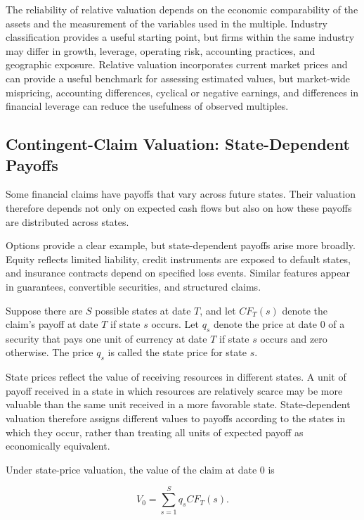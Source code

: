 The reliability of relative valuation depends on the economic comparability of the assets and the measurement of the variables used in the multiple. Industry classification provides a useful starting point, but firms within the same industry may differ in growth, leverage, operating risk, accounting practices, and geographic exposure. Relative valuation incorporates current market prices and can provide a useful benchmark for assessing estimated values, but market-wide mispricing, accounting differences, cyclical or negative earnings, and differences in financial leverage can reduce the usefulness of observed multiples.


\subsection{Contingent-Claim Valuation: State-Dependent Payoffs}

Some financial claims have payoffs that vary across future states. Their valuation therefore depends not only on expected cash flows but also on how these payoffs are distributed across states.

Options provide a clear example, but state-dependent payoffs arise more broadly. Equity reflects limited liability, credit instruments are exposed to default states, and insurance contracts depend on specified loss events. Similar features appear in guarantees, convertible securities, and structured claims.

Suppose there are $S$ possible states at date $T$, and let $CF_T(s)$ denote the claim's payoff at date $T$ if state $s$ occurs. Let $q_s$ denote the price at date 0 of a security that pays one unit of currency at date $T$ if state $s$ occurs and zero otherwise. The price $q_s$ is called the state price for state $s$.

State prices reflect the value of receiving resources in different states. A unit of payoff received in a state in which resources are relatively scarce may be more valuable than the same unit received in a more favorable state. State-dependent valuation therefore assigns different values to payoffs according to the states in which they occur, rather than treating all units of expected payoff as economically equivalent.

Under state-price valuation, the value of the claim at date 0 is

\begin{equation}
V_0=\sum_{s=1}^{S}q_s CF_T(s).
\end{equation}

